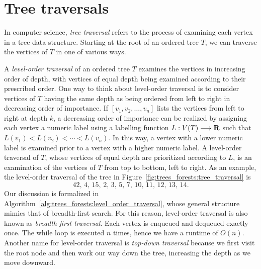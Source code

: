 \section{Tree traversals}
\label{sec:trees_forests:tree_traversals}

In computer science,
\emph{tree traversal} refers to the process of
examining each vertex in a tree data structure. Starting at the root
of an ordered tree $T$, we can traverse the
vertices of $T$ in one of various ways.

A \emph{level-order traversal} of an
ordered tree $T$ examines the vertices in increasing order of depth,
with vertices of equal depth being examined according to their
prescribed order. One way to think about
level-order traversal is to consider
vertices of $T$ having the same depth as being ordered from left to
right in decreasing order of importance. If $[v_1, v_2, \dots, v_n]$
lists the vertices from left to right at depth $k$, a decreasing order
of importance can be realized by assigning each vertex a numeric label
using a labelling function $L: V(T) \longrightarrow \mathbf{R}$ such that
$L(v_1) < L(v_2) < \cdots < L(v_n)$. In this way, a vertex with a
lower numeric label is examined prior to a vertex with a higher
numeric label. A level-order traversal of
$T$, whose vertices of equal depth are prioritized according to $L$,
is an examination of the vertices of $T$ from top to bottom, left to
right. As an example, the level-order
traversal of the tree in Figure~\ref{fig:trees_forests:tree_traversal}
is
\[
42,\, 4,\, 15,\, 2,\, 3,\, 5,\, 7,\, 10,\, 11,\, 12,\, 13,\, 14.
\]
Our discussion is formalized in
Algorithm~\ref{alg:trees_forests:level_order_traversal}, whose general
structure mimics that of breadth-first
search. For this reason, level-order traversal is also known as
\emph{breadth-first traversal}. Each vertex is
enqueued and dequeued
exactly once. The while loop is executed $n$ times, hence we have a
runtime of $O(n)$. Another name for level-order traversal is
\emph{top-down traversal} because we first visit the root node and
then work our way down the tree, increasing the depth as we move
downward.

